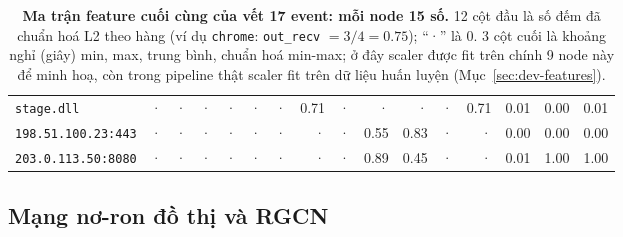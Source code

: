 \begin{table}[H]
\begin{tabular}{l *{6}{r} *{6}{r} *{3}{r}}
\texttt{stage.dll} & \textcolor{gray!50}{·} & \textcolor{gray!50}{·} & \textcolor{gray!50}{·} & \textcolor{gray!50}{·} & \textcolor{gray!50}{·} & \textcolor{gray!50}{·} & 0.71 & \textcolor{gray!50}{·} & \textcolor{gray!50}{·} & \textcolor{gray!50}{·} & \textcolor{gray!50}{·} & 0.71 & 0.01 & 0.00 & 0.01 \\
\texttt{198.51.100.23:443} & \textcolor{gray!50}{·} & \textcolor{gray!50}{·} & \textcolor{gray!50}{·} & \textcolor{gray!50}{·} & \textcolor{gray!50}{·} & \textcolor{gray!50}{·} & \textcolor{gray!50}{·} & \textcolor{gray!50}{·} & 0.55 & 0.83 & \textcolor{gray!50}{·} & \textcolor{gray!50}{·} & 0.00 & 0.00 & 0.00 \\
\texttt{203.0.113.50:8080} & \textcolor{gray!50}{·} & \textcolor{gray!50}{·} & \textcolor{gray!50}{·} & \textcolor{gray!50}{·} & \textcolor{gray!50}{·} & \textcolor{gray!50}{·} & \textcolor{gray!50}{·} & \textcolor{gray!50}{·} & 0.89 & 0.45 & \textcolor{gray!50}{·} & \textcolor{gray!50}{·} & 0.01 & 1.00 & 1.00 \\
\bottomrule
\end{tabular}
\caption{\textbf{Ma trận feature cuối cùng của vết 17 event: mỗi node 15 số.} 12 cột đầu là số đếm đã chuẩn hoá L2 theo hàng (ví dụ \texttt{chrome}: \texttt{out\_recv} $= 3/4 = 0.75$); ``·'' là 0. 3 cột cuối là khoảng nghỉ (giây) min, max, trung bình, chuẩn hoá min-max; ở đây scaler được fit trên chính 9 node này để minh hoạ, còn trong pipeline thật scaler fit trên dữ liệu huấn luyện (Mục~\ref{sec:dev-features}).}
\label{tab:feat-final}
\end{table}

\subsection{Mạng nơ-ron đồ thị và RGCN}
\label{sec:theory-rgcn}

